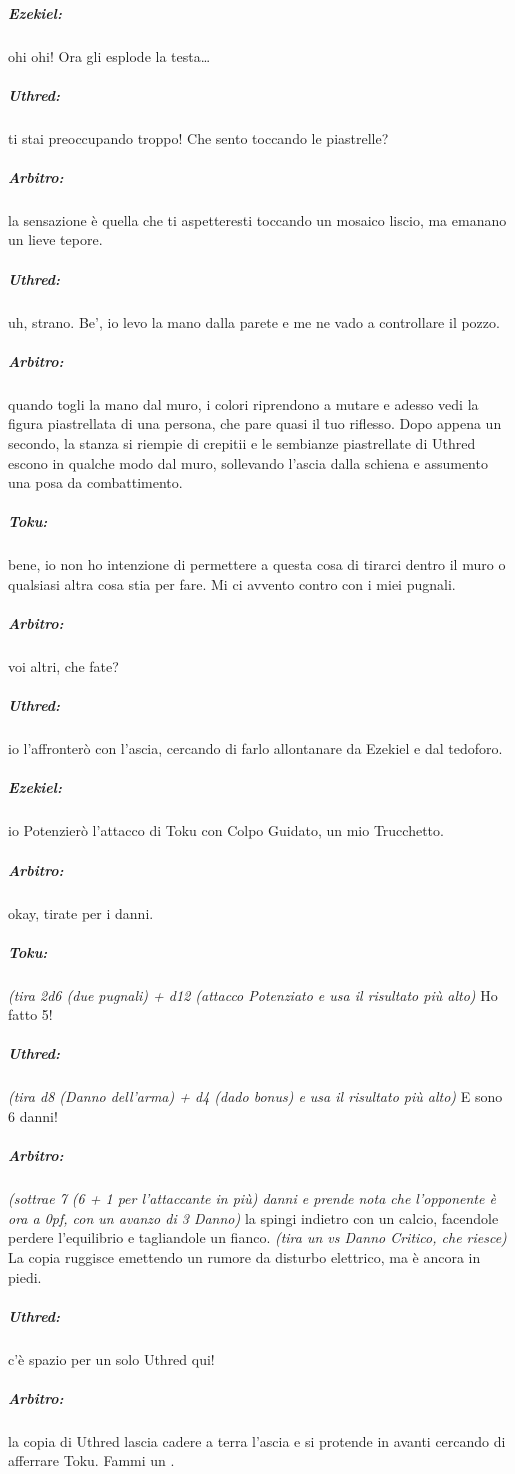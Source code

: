 \documentclass[itdr]{subfiles}
\begin{document}
{\subparagraph{Ezekiel:} ohi ohi! Ora gli esplode la testa\ldots

\subparagraph{Uthred:} ti stai preoccupando troppo! Che sento toccando le piastrelle?

\subparagraph{Arbitro:} la sensazione è quella che ti aspetteresti toccando un mosaico liscio, ma emanano un lieve tepore.

\subparagraph{Uthred:} uh, strano. Be', io levo la mano dalla parete e me ne vado a controllare il pozzo.

\vfill
\break

\subparagraph{Arbitro:} quando togli la mano dal muro, i colori riprendono a mutare e adesso vedi la figura piastrellata di una persona, che pare quasi il tuo riflesso. Dopo appena un secondo, la stanza si riempie di crepitii e le sembianze piastrellate di Uthred escono in qualche modo dal muro, sollevando l'ascia dalla schiena e assumento una posa da combattimento.

\subparagraph{Toku:} bene, io non ho intenzione di permettere a questa cosa di tirarci dentro il muro o qualsiasi altra cosa stia per fare. Mi ci avvento contro con i miei pugnali.

\subparagraph{Arbitro:} voi altri, che fate?

\subparagraph{Uthred:} io l'affronterò con l'ascia, cercando di farlo allontanare da Ezekiel e dal tedoforo.

\subparagraph{Ezekiel:} io Potenzierò l'attacco di Toku con Colpo Guidato, un mio Trucchetto.

\subparagraph{Arbitro:} okay, tirate per i danni.

\subparagraph{Toku:} {\em (tira 2d6 (due pugnali) + d12 (attacco Potenziato e usa il risultato più alto)} Ho fatto 5!

\subparagraph{Uthred:} {\em (tira d8 (Danno dell'arma) + d4 (dado bonus) e usa il risultato più alto)} E sono 6 danni!

\subparagraph{Arbitro:} {\em (sottrae 7 (6 + 1 per l'attaccante in più) danni e prende nota che l'opponente è ora a 0pf, con un avanzo di 3 Danno)} la spingi indietro con un calcio, facendole perdere l'equilibrio e tagliandole un fianco. {\em (tira un  vs Danno Critico, che riesce)} La copia ruggisce emettendo un rumore da disturbo elettrico, ma è ancora in piedi.

\subparagraph{Uthred:} c'è spazio per un solo Uthred qui!

\subparagraph{Arbitro:} la copia di Uthred lascia cadere a terra l'ascia e si protende in avanti cercando di afferrare Toku. Fammi un .

}
\end{document}
